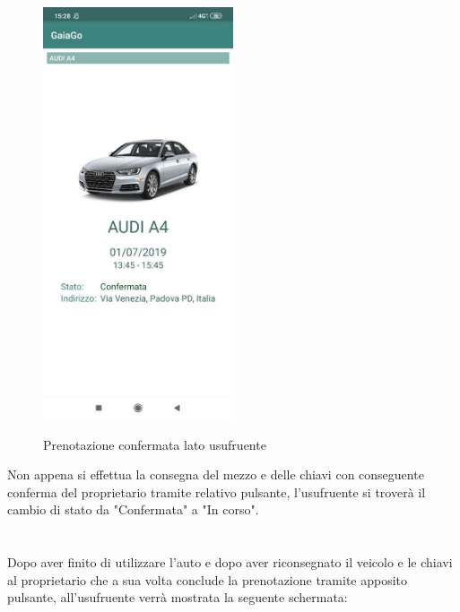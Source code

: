 \begin{itemize}
\begin{figure}[H]
		\includegraphics[width=0.5\textwidth]{res/images/conferma_usufruente.png}\\
		\caption{Prenotazione confermata lato usufruente}
		\label{conferma usufruente}
	\end{figure}
	Non appena si effettua la consegna del mezzo e delle chiavi con conseguente conferma del proprietario tramite relativo pulsante, l'usufruente si troverà il cambio di stato da "Confermata" a "In corso".
	\\ \\ \\
	Dopo aver finito di utilizzare l'auto e dopo aver riconsegnato il veicolo e le chiavi al proprietario che a sua volta conclude la prenotazione tramite apposito pulsante, all'usufruente verrà mostrata la seguente schermata:
	\begin{figure}[H] 
		\centering 

\end{figure}
\end{itemize}
